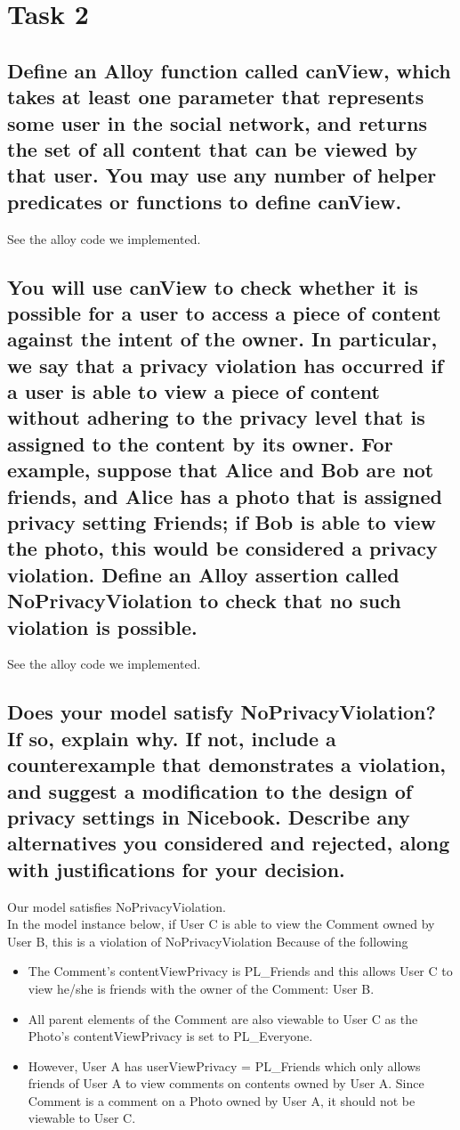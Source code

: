 \documentclass[titlepage]{article}
\begin{document}
\section{Task 2}
\subsection{Define an Alloy function called canView, which takes at least one parameter that represents some user in the
	social network, and returns the set of all content that can be viewed by that user. You may use any number of
	helper predicates or functions to define canView.}

See the alloy code we implemented.

\subsection{You will use canView to check whether it is possible for a user to access a piece of content against the intent of the owner. In particular, we say that a privacy violation has occurred if a user is able to view a piece of content without adhering to the privacy level that is assigned to the content by its owner. For example, suppose that Alice
	and Bob are not friends, and Alice has a photo that is assigned privacy setting Friends; if Bob is able to view the
	photo, this would be considered a privacy violation. Define an Alloy assertion called NoPrivacyViolation
	to check that no such violation is possible.}

See the alloy code we implemented.

\subsection{Does your model satisfy NoPrivacyViolation? If so, explain why. If not, include a counterexample that
	demonstrates a violation, and suggest a modification to the design of privacy settings in Nicebook. Describe
	any alternatives you considered and rejected, along with justifications for your decision.}

Our model satisfies NoPrivacyViolation. \\
In the model instance below, if User C is able to view the Comment owned by User B, this is a violation of NoPrivacyViolation Because of the following
\begin{itemize}
	\item The Comment's contentViewPrivacy is PL\_Friends and this allows User C to view he/she is friends with the owner of the Comment: User B.
	\item All parent elements of the Comment are also viewable to User C as the Photo's contentViewPrivacy is set to PL\_Everyone.
	\item However, User A has userViewPrivacy = PL\_Friends which only allows friends of User A to view comments on contents owned by User A. Since Comment is a comment on a Photo owned by User A, it should not be viewable to User C.
\end{itemize} 
\end{document}
